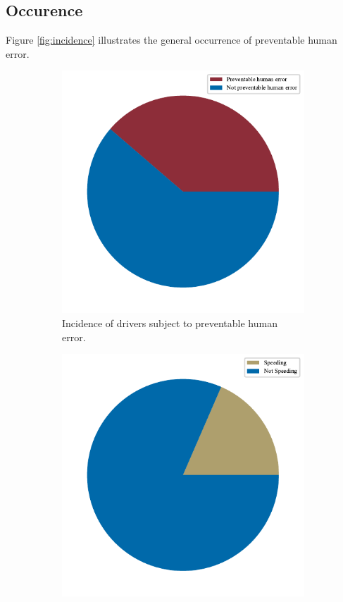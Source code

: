 \documentclass{article}
\theoremstyle{plain}
\theoremstyle{definition}
\theoremstyle{remark}
\begin{document}
\subsection{Occurence}
Figure \ref{fig:incidence} illustrates the general occurrence of preventable human error.
\begin{figure}[ht]
	\vskip 0.2in
	\centering
		\begin{subfigure}[ht]{0.49\columnwidth}
			\includegraphics[width=\columnwidth]{plots/err-incidence-total}
			\caption{Incidence of drivers subject to preventable human error.}
			\label{fig:err-incidence-total}
		\end{subfigure}
		\hfill
		\begin{subfigure}[ht]{0.49\columnwidth}
			\includegraphics[width=\columnwidth]{plots/err-incidence-speeding}

\end{subfigure}
\end{figure}
\end{document}
